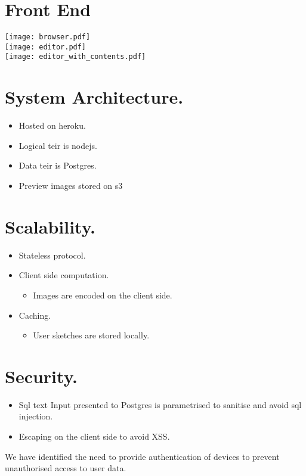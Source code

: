 \documentclass[10pt,a4paper]{article}
\begin{document}


\section*{Front End}
\texttt{[image: browser.pdf]}
\hfill\\
\texttt{[image: editor.pdf]}
\hfill\\
\texttt{[image: editor\_with\_contents.pdf]}


\newpage
\section*{System Architecture.}
  \begin{itemize}
    \item Hosted on heroku.
    \item Logical teir is nodejs.
    \item Data teir is Postgres.
    \item Preview images stored on s3
  \end{itemize}


\newpage
\section*{Scalability.}
  \begin{itemize}
    \item Stateless protocol.
    \item Client side computation.
    \begin{itemize}
      \item Images are encoded on the client side.
    \end{itemize}				
    \item Caching.
    \begin{itemize}
	\item User sketches are stored locally.
    \end{itemize}				
   \end{itemize}


\newpage
\section*{Security.}
  \begin{itemize}
    \item Sql text Input presented to Postgres is parametrised to sanitise and avoid sql injection.
    \item Escaping on the client side to avoid XSS.
  \end{itemize}
We have identified the need to provide authentication of devices to prevent unauthorised access to  user data.
\end{document}
